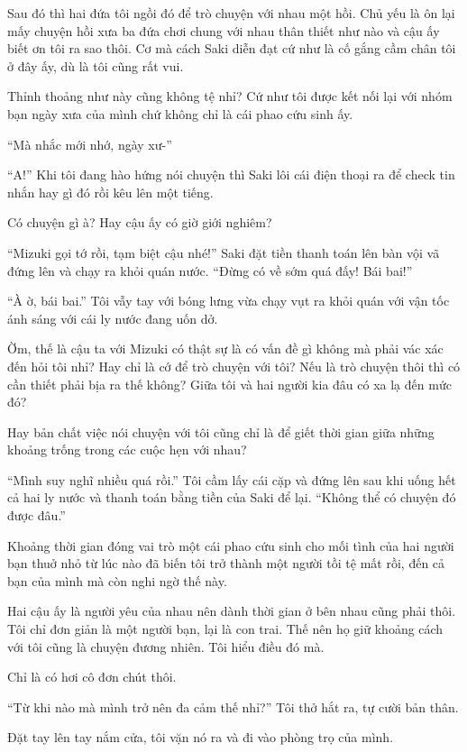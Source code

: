 {Sau đó thì hai đứa tôi ngồi đó để trò chuyện với nhau một hồi. Chủ yếu
là ôn lại mấy chuyện hồi xưa ba đứa chơi chung với nhau thân thiết như
nào và cậu ấy biết ơn tôi ra sao thôi. Cơ mà cách Saki diễn đạt cứ như
là cố gắng cầm chân tôi ở đây ấy, dù là tôi cũng rất vui.

Thỉnh thoảng như này cũng không tệ nhỉ? Cứ như tôi được kết nối lại với
nhóm bạn ngày xưa của mình chứ không chỉ là cái phao cứu sinh ấy.

``Mà nhắc mới nhớ, ngày xư-''

``A!'' Khi tôi đang hào hứng nói chuyện thì Saki lôi cái điện thoại ra
để check tin nhắn hay gì đó rồi kêu lên một tiếng.

Có chuyện gì à? Hay cậu ấy có giờ giới nghiêm?

``Mizuki gọi tớ rồi, tạm biệt cậu nhé!'' Saki đặt tiền thanh toán lên
bàn vội vã đứng lên và chạy ra khỏi quán nước. ``Đừng có về sớm quá đấy!
Bái bai!''

``À ờ, bái bai.'' Tôi vẫy tay với bóng lưng vừa chạy vụt ra khỏi quán
với vận tốc ánh sáng với cái ly nước đang uốn dở.

Ờm, thế là cậu ta với Mizuki có thật sự là có vấn đề gì không mà phải
vác xác đến hỏi tôi nhỉ? Hay chỉ là cớ để trò chuyện với tôi? Nếu là trò
chuyện thôi thì có cần thiết phải bịa ra thế không? Giữa tôi và hai
người kia đâu có xa lạ đến mức đó?

Hay bản chất việc nói chuyện với tôi cũng chỉ là để giết thời gian giữa
những khoảng trống trong các cuộc hẹn với nhau?

``Mình suy nghĩ nhiều quá rồi.'' Tôi cầm lấy cái cặp và đứng lên sau khi
uống hết cả hai ly nước và thanh toán bằng tiền của Saki để lại. ``Không
thể có chuyện đó được đâu.''

Khoảng thời gian đóng vai trò một cái phao cứu sinh cho mối tình của hai
người bạn thuở nhỏ từ lúc nào đã biến tôi trở thành một người tồi tệ mất
rồi, đến cả bạn của mình mà còn nghi ngờ thế này.

Hai cậu ấy là người yêu của nhau nên dành thời gian ở bên nhau cũng phải
thôi. Tôi chỉ đơn giản là một người bạn, lại là con trai. Thế nên họ giữ
khoảng cách với tôi cũng là chuyện đương nhiên. Tôi hiểu điều đó mà.

Chỉ là có hơi cô đơn chút thôi.

``Từ khi nào mà mình trở nên đa cảm thế nhỉ?'' Tôi thở hắt ra, tự cười
bản thân.

Đặt tay lên tay nắm cửa, tôi vặn nó ra và đi vào phòng trọ của mình.

}
